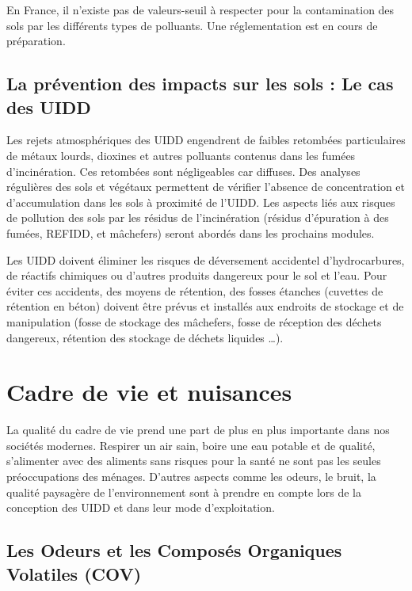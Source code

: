 En France, il n’existe pas de valeurs-seuil à respecter pour la contamination des sols par les différents types de polluants. Une réglementation est en cours de préparation.




\subsection{La prévention des impacts sur les sols : Le cas des UIDD } 


Les rejets atmosphériques des UIDD engendrent de faibles retombées particulaires de 
métaux lourds, dioxines et autres polluants contenus dans les fumées d’incinération. Ces 
retombées sont négligeables car diffuses. Des analyses régulières des sols et végétaux 
permettent de vérifier l’absence de concentration et d’accumulation dans les sols à proximité de l’UIDD.
Les aspects liés aux risques de pollution des sols par les résidus de l’incinération (résidus d’épuration à des fumées, REFIDD, et mâchefers) seront abordés dans les prochains modules.


\vspace{0.3cm} 


Les UIDD doivent éliminer les risques de déversement accidentel d’hydrocarbures, de réactifs chimiques ou d’autres produits dangereux pour le sol et l’eau. Pour éviter ces accidents, des moyens de rétention, des fosses étanches (cuvettes de rétention en béton) doivent être prévus et installés aux endroits de stockage et de manipulation (fosse de stockage des mâchefers, fosse de réception des déchets dangereux, rétention des stockage de déchets liquides …).


\section{Cadre de vie et nuisances}


La qualité du cadre de vie prend une part de plus en plus importante dans nos sociétés modernes. Respirer un air sain, boire une eau potable et de qualité, s’alimenter avec des aliments sans risques pour la santé ne sont pas les seules préoccupations des ménages. D’autres aspects comme les odeurs, le bruit, la qualité paysagère de l’environnement sont à prendre en compte lors de la conception des UIDD et dans leur mode d’exploitation.


\subsection{Les Odeurs et les Composés Organiques Volatiles (COV)}

